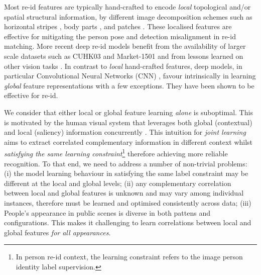 \documentclass{article}
\begin{document}
Most re-id features  
are typically hand-crafted to 
encode {\em local} topological and/or spatial structural information,
by different image decomposition schemes such as 
horizontal stripes \cite{ELF_ECCV08,colorInvariants},  
body parts \cite{SDALF_CVPR10}, 
and patches \cite{SalienceReId_CVPR13,GOG,liao2015person}. 
These localised features are effective 
for mitigating the person pose and detection misalignment in re-id matching. 
More recent deep re-id models \cite{xiao2016learning,wangjoint,chen2016multi,ahmed2015improved} 
benefit from the availability of larger scale datasets such as
CUHK03 \cite{li2014deepreid} and Market-1501 \cite{zheng2015scalable}
and from lessons learned on other vision
tasks \cite{krizhevsky2012imagenet,girshick2014rich}. 
In contrast to {\em local} hand-crafted features,
deep models, in particular Convolutional Neural Networks
(CNN) \cite{lecun1998gradient}, favour intrinsically in learning {\em
global} feature representations with a few exceptions. They have been
shown to be effective for re-id. 


We consider that either local or global feature learning {\em alone} is
suboptimal. This is motivated by the human visual system
that leverages both global (contextual) and local (saliency) information concurrently
\cite{navon1977forest,torralba2006contextual}.
This intuition for {\em joint learning} aims to extract correlated
complementary information in different context whilst {\em satisfying the
same learning constraint}\footnote{In person re-id context, the learning constraint
refers to the image person identity label supervision.} 
therefore achieving more reliable recognition.
To that end, we need to address a number of non-trivial problems:
(i) the model learning behaviour in satisfying the same label
constraint may be different at the local and global levels;
(ii) any complementary correlation between local and global features
is unknown and may vary among individual instances, therefore must
be learned and optimised consistently across data; 
(iii) People's appearance in public scenes is diverse in both pattens
and configurations. This makes it challenging to learn correlations between local and
global features {\em for all appearances}.
\end{document}
